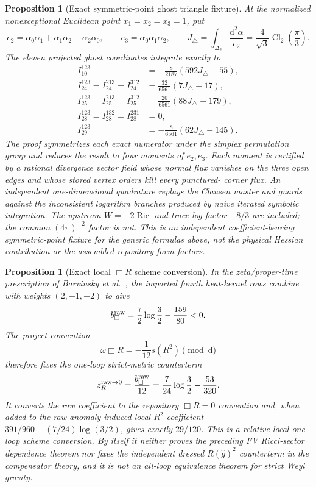\documentclass[11pt]{article}
\newtheorem{proposition}[theorem]{Proposition}
\theoremstyle{definition}
\theoremstyle{remark}
\newcommand{\dd}{\mathrm d}
\begin{document}
\begin{proposition}[Exact symmetric-point ghost triangle fixture]
At the normalized nonexceptional Euclidean point
$x_1=x_2=x_3=1$, put
\[
 e_2=\alpha_0\alpha_1+\alpha_1\alpha_2+\alpha_2\alpha_0,
 \qquad e_3=\alpha_0\alpha_1\alpha_2,
 \qquad
 J_\triangle=\int_{\Delta_2}\frac{\dd^2\alpha}{e_2}
 =\frac4{\sqrt3}\operatorname{Cl}_2\!\left(\frac\pi3\right).
\]
The eleven projected ghost coordinates integrate exactly to
\[
\begin{aligned}
 I_{10}^{123}&=-\frac8{2187}(592J_\triangle+55),\\
 I_{24}^{123}=I_{24}^{213}=I_{24}^{312}
   &=\frac{32}{6561}(7J_\triangle-17),\\
 I_{25}^{123}=I_{25}^{213}=I_{25}^{312}
   &=\frac{20}{6561}(88J_\triangle-179),\\
 I_{28}^{123}=I_{28}^{132}=I_{28}^{231}&=0,\\
 I_{29}^{123}&=-\frac8{6561}(62J_\triangle-145).
\end{aligned}
\]
The proof symmetrizes each exact numerator under the simplex permutation
group and reduces the result to four moments of $e_2,e_3$.  Each moment is
certified by a rational divergence vector field whose normal flux vanishes
on the three open edges and whose stored vertex orders kill every punctured-
corner flux.  An independent one-dimensional quadrature replays the Clausen
master and guards against the inconsistent logarithm branches produced by
naive iterated symbolic integration.  The upstream $W=-2\operatorname{Ric}$
and trace-log factor $-8/3$ are included; the common $(4\pi)^{-2}$ factor is
not.  This is an independent coefficient-bearing symmetric-point fixture for
the generic formulas above, not the physical Hessian contribution or the
assembled repository form factors.
\end{proposition}

\begin{proposition}[Exact local $\Box R$ scheme conversion]
In the zeta/proper-time prescription of Barvinsky et
al.~\cite{BarvinskyLocal}, the imported fourth heat-kernel rows combine with
weights $(2,-1,-2)$ to give
\[
 b_{\Box}^{\rm raw}=\frac72\log\frac32-\frac{159}{80}<0.
\]
The project convention
\[
 \omega\Box R=-\frac1{12}s(R^2)\pmod{\dd}
\]
therefore fixes the one-loop strict-metric counterterm
\[
 z_R^{\rm raw\to0}=\frac{b_{\Box}^{\rm raw}}{12}
 =\frac7{24}\log\frac32-\frac{53}{320}.
\]
It converts the raw coefficient to the repository $\Box R=0$ convention and,
when added to the raw anomaly-induced local $R^2$ coefficient
$391/960-(7/24)\log(3/2)$, gives exactly $29/120$.  This is a relative local
one-loop scheme conversion.  By itself it neither proves the preceding FV
Ricci-sector dependence theorem nor fixes the independent dressed
$R(\widehat g)^2$ counterterm in the compensator theory, and it is not an
all-loop equivalence theorem for strict Weyl gravity.
\end{proposition}
\end{document}

